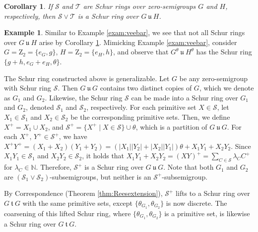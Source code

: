 \documentclass{article}
\theoremstyle{plain}
\newtheorem{Cor}[Thm]{Corollary}
\theoremstyle{definition}
\newtheorem{Exam}[Thm]{Example}
\newcommand{\thmref}[1]{Theorem \ref{#1}}
\newcommand{\corref}[1]{Corollary \ref{#1}}
\newcommand{\examref}[1]{Example \ref{#1}}
\renewcommand{\S}{\mathcal{S}}
\newcommand{\T}{\mathcal{T}}
\newcommand{\N}{\mathbb{N}}
\newcommand{\z}{\mathrm{Z}}
\renewcommand{\t}{\ \mathfrak{t}\ }
\renewcommand{\u}{\ \mathfrak{u}\ }
\begin{document}
\begin{Cor}\label{thm:thetastackrings}
 If $\S$ and $\T$ are Schur rings over zero-semigroups $G$ and $H$, respectively, then $\S\vee \T$ is a Schur ring over $G \u H$.
\end{Cor}

\begin{Exam}
Similar to \examref{exam:veebar}, we see that not all Schur rings over $G\u H$ arise by \corref{thm:thetastackrings}. Mimicking \examref{exam:veebar}, consider $G = \z_2 = \{e_G, g\}$, $H=\z_2 = \{e_H, h\}$, and observe that $G^\theta \u H^\theta$ has the Schur ring $\{g+ h, e_G+e_H, \theta\}$.

The Schur ring constructed above is generalizable. Let $G$ be any zero-semigroup with Schur ring $\S$. Then $G\u G$ contains two distinct copies of $G$, which we denote as $G_1$ and $G_2$. Likewise, the Schur ring $\S$ can be made into a Schur ring over $G_1$ and $G_2$, denoted $\S_1$ and $\S_2$, respectively. For each primitive set $X\in \S$, let $X_1\in \S_1$ and $X_2\in \S_2$ be the corresponding primitive sets. Then, we define $X^+ = X_1\cup X_2$, and $\S^+ = \{X^+\mid X\in \S\}\cup\theta$, which is a partition of $G\u G$. For each $X^+$, $Y^+\in \S^+$, we have $X^+Y^+ = (X_1+X_2)(Y_1+Y_2) = (|X_1||Y_2|+|X_2||Y_1|)\theta + X_1Y_1+X_2Y_2$. Since $X_1Y_1\in \S_1$ and $X_2Y_2\in \S_2$, it holds that $X_1Y_1+X_2Y_2 = (XY)^+ = \sum_{C\in \S} \lambda_CC^+$ for $\lambda_C\in \N$. Therefore, $\S^+$ is a Schur ring over $G\u G$. Note that both $G_1$ and $G_2$ are $(\S_1\vee\S_2)$-subsemigroups, but neither is an $\S^+$-subsemigroup.

By Correspondence (\thmref{thm:Reesextension}), $\S^+$ lifts to a Schur ring over $G\t G$ with the same primitive sets, except $\{\theta_{G_1}, \theta_{G_2}\}$ is now discrete. The coarsening of this lifted Schur ring, where $\{\theta_{G_1}, \theta_{G_2}\}$ is a primitive set, is likewise a Schur ring over $G\t G$.
\end{Exam}
\end{document}
